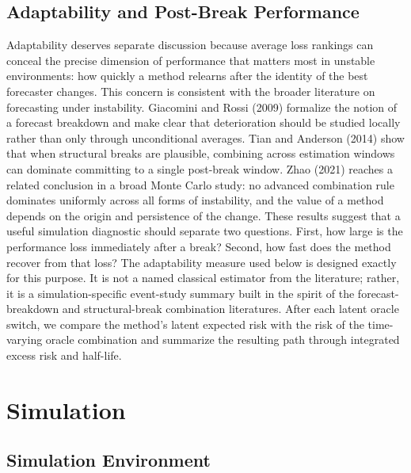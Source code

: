 \documentclass[11pt,a4paper]{article}
\begin{document}
\subsection{Adaptability and Post-Break Performance}

Adaptability deserves separate discussion because average loss rankings can conceal the precise dimension of performance that matters most in unstable environments: how quickly a method relearns after the identity of the best forecaster changes. This concern is consistent with the broader literature on forecasting under instability. Giacomini and Rossi (2009) formalize the notion of a forecast breakdown and make clear that deterioration should be studied locally rather than only through unconditional averages. Tian and Anderson (2014) show that when structural breaks are plausible, combining across estimation windows can dominate committing to a single post-break window. Zhao (2021) reaches a related conclusion in a broad Monte Carlo study: no advanced combination rule dominates uniformly across all forms of instability, and the value of a method depends on the origin and persistence of the change. These results suggest that a useful simulation diagnostic should separate two questions. First, how large is the performance loss immediately after a break? Second, how fast does the method recover from that loss? The adaptability measure used below is designed exactly for this purpose. It is not a named classical estimator from the literature; rather, it is a simulation-specific event-study summary built in the spirit of the forecast-breakdown and structural-break combination literatures. After each latent oracle switch, we compare the method's latent expected risk with the risk of the time-varying oracle combination and summarize the resulting path through integrated excess risk and half-life.

\setcounter{section}{4}
\section{Simulation}

\subsection{Simulation Environment}
\end{document}
